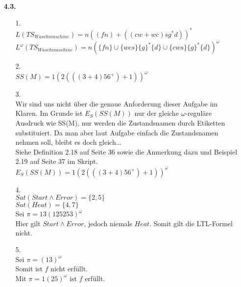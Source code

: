 \documentclass[a4paper,11pt,fleqn]{scrartcl}
\title{\titleinfo}
\author{\authorinfo}
\begin{document}
\maketitle
        \begin{enumerate}
        \item[\textbf{4.3.}]
                \begin{enumerate}
                        \item[1.]\quad \\
                        	$L(TS_{Waschmaschine}) = n((fn)+((cw+wc)sg^*d))^*$ \\
                            $L^\omega(TS_{Waschmaschine}) = n(\{fn\}\cup\{wcs\}\{g\}^*\{d\}\cup\{cws\}\{g\}^*\{d\})^\omega$
                        \item[2.]\quad \\
                        	$SS(M)=1(2(((3 + 4)56^+)+1))^\omega$
                        \item[3.]\quad \\
                        	Wir sind uns nicht über die genaue Anforderung dieser Aufgabe im Klaren. Im Grunde ist $E_S(SS(M))$ nur der gleiche $\omega$-reguläre Ausdruck wie SS(M), nur werden die Zustandsnamen durch Etiketten substituiert. Da man aber laut Aufgabe einfach die Zustandsnamen nehmen soll, bleibt es doch gleich... \\
                            Siehe Definition 2.18 auf Seite 36 sowie die Anmerkung dazu und Beispiel 2.19 auf Seite 37 im Skript. \\
                        	$E_S(SS(M)) = 1(2(((3 + 4)56^+)+1))^\omega$
                        \item[4.]\quad \\
                        	$Sat(Start \land Error) = \{2,5\}$\\
                            $Sat(Heat) = \{4,7\}$\\
                            Sei $\pi = 13(125253)^\omega$\\
                           	Hier gilt $Start \land Error$, jedoch niemals $Heat$. Somit gilt die LTL-Formel nicht.
                        \item[5.]\quad \\
                        	Sei $\pi = (13)^\omega$\\
                            Somit ist $f$ nicht erfüllt.\\
                            Mit $\pi = 1(25)^\omega$ ist $f$ erfüllt.
               \end{enumerate}

\end{enumerate}
\end{document}
